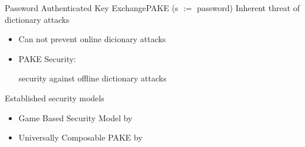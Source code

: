 \documentclass[notes,xcolor=dvipsnames]{beamer}
\begin{document}
% 	
% 	
%
\begin{frame}{Password Authenticated Key Exchange}{PAKE (s $:=$ password)}
	Inherent threat of dictionary attacks
	\begin{itemize}
		\item Can not prevent online dicionary attacks
		\item PAKE Security:\\\begin{center} \alert{security against offline dictionary attacks}\end{center}
	\end{itemize}
	
	\vspace*{2em}
	Established security models
	\begin{itemize}
		\item Game Based Security Model by \cite{Bellare2000}%
		\item Universally Composable PAKE by \cite{Canetti2005}%
	\end{itemize}
\end{frame}
\end{document}
